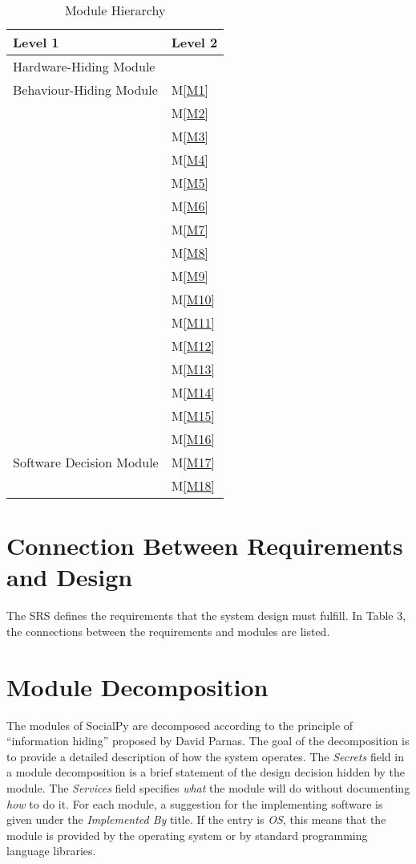 \documentclass[12pt, titlepage]{article}
\newcommand{\mref}[1]{M\ref{#1}}
\begin{document}
\begin{table}[!ht]
\centering
\begin{tabular}{p{} p{}}
\toprule
\textbf{Level 1} & \textbf{Level 2}\\
\midrule

{Hardware-Hiding Module} & ~ \\
\midrule

{Behaviour-Hiding Module} & \mref{M1}\\
& \mref{M2}\\
& \mref{M3}\\
& \mref{M4}\\
& \mref{M5}\\
& \mref{M6}\\
& \mref{M7}\\ 
& \mref{M8}\\
& \mref{M9}\\
& \mref{M10}\\ 
& \mref{M11}\\
& \mref{M12}\\ 
& \mref{M13}\\
& \mref{M14}\\
& \mref{M15}\\ 
& \mref{M16}\\
\midrule

{Software Decision Module} & \mref{M17}\\
& \mref{M18}\\
\bottomrule

\end{tabular}
\caption{Module Hierarchy}
\label{TblMH}
\end{table}

\newpage
\section{Connection Between Requirements and Design} \label{SecConnection}
The SRS defines the requirements that the system design must fulfill. In Table 3, the connections between the requirements and modules are listed.

\section{Module Decomposition} \label{SecMD}

The modules of SocialPy are decomposed  according to the principle of ``information hiding''
proposed by David Parnas. The goal of the decomposition is to provide a detailed description of how the system operates. The \emph{Secrets} field in a module
decomposition is a brief statement of the design decision hidden by the
module. The \emph{Services} field specifies \emph{what} the module will do
without documenting \emph{how} to do it. For each module, a suggestion for the
implementing software is given under the \emph{Implemented By} title. If the
entry is \emph{OS}, this means that the module is provided by the operating
system or by standard programming language libraries. 
\end{document}
